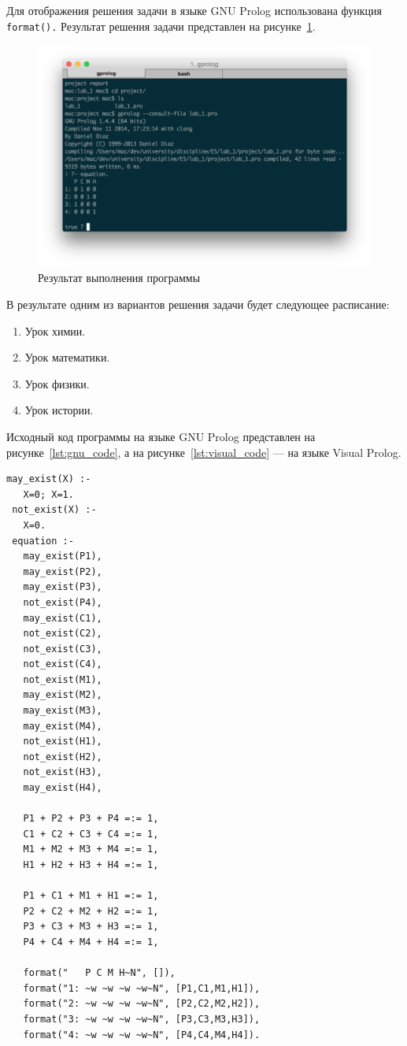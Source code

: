 Для отображения решения задачи в языке GNU Prolog использована функция \texttt{format().}
Результат решения задачи представлен на рисунке~\ref{fig:figure}.

\begin{figure}[h!]
  \centering
  \includegraphics[width=150mm]{img/figure}
  \caption{Результат выполнения программы}
  \label{fig:figure}
\end{figure}

В результате одним из вариантов решения задачи будет следующее расписание:
\begin{enumerate}
  \item Урок химии.
  \item Урок математики.
  \item Урок физики.
  \item Урок истории.
\end{enumerate}

\pagebreak
Исходный код программы на языке GNU Prolog представлен на рисунке~\ref{lst:gnu_code}, а на рисунке~\ref{lst:visual_code} ---
на языке Visual Prolog.

\begin{lstlisting}[style=source_code,caption=Исходный код программы на языке GNU Prolog,label=lst:gnu_code]
 may_exist(X) :-
   X=0; X=1.
 not_exist(X) :-
   X=0.
 equation :-
   may_exist(P1),
   may_exist(P2),
   may_exist(P3),
   not_exist(P4),
   may_exist(C1),
   not_exist(C2),
   not_exist(C3),
   not_exist(C4),
   not_exist(M1),
   may_exist(M2),
   may_exist(M3),
   may_exist(M4),
   not_exist(H1),
   not_exist(H2),
   not_exist(H3),
   may_exist(H4),

   P1 + P2 + P3 + P4 =:= 1,
   C1 + C2 + C3 + C4 =:= 1,
   M1 + M2 + M3 + M4 =:= 1,
   H1 + H2 + H3 + H4 =:= 1,

   P1 + C1 + M1 + H1 =:= 1,
   P2 + C2 + M2 + H2 =:= 1,
   P3 + C3 + M3 + H3 =:= 1,
   P4 + C4 + M4 + H4 =:= 1,
   
   format("   P C M H~N", []),
   format("1: ~w ~w ~w ~w~N", [P1,C1,M1,H1]),
   format("2: ~w ~w ~w ~w~N", [P2,C2,M2,H2]),
   format("3: ~w ~w ~w ~w~N", [P3,C3,M3,H3]),
   format("4: ~w ~w ~w ~w~N", [P4,C4,M4,H4]).
\end{lstlisting}

